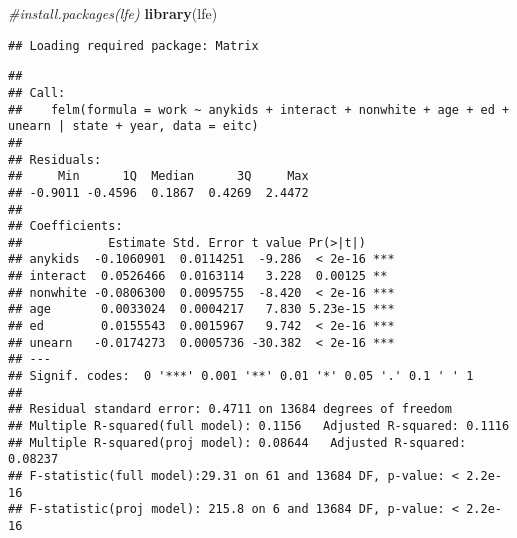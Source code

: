 \documentclass[
]{article}
\newenvironment{Shaded}{\begin{snugshade}}{\end{snugshade}}
\newcommand{\AttributeTok}[1]{\textcolor[rgb]{0.13,0.29,0.53}{#1}}
\newcommand{\CommentTok}[1]{\textcolor[rgb]{0.56,0.35,0.01}{\textit{#1}}}
\newcommand{\FunctionTok}[1]{\textcolor[rgb]{0.13,0.29,0.53}{\textbf{#1}}}
\newcommand{\NormalTok}[1]{#1}
\newcommand{\OtherTok}[1]{\textcolor[rgb]{0.56,0.35,0.01}{#1}}
\newcommand{\SpecialCharTok}[1]{\textcolor[rgb]{0.81,0.36,0.00}{\textbf{#1}}}
\begin{document}
\begin{Shaded}
\begin{Highlighting}[]
\CommentTok{\#install.packages(\textquotesingle{}lfe\textquotesingle{})}
\FunctionTok{library}\NormalTok{(lfe)}
\end{Highlighting}
\end{Shaded}

\begin{verbatim}
## Loading required package: Matrix
\end{verbatim}

\begin{Shaded}
\end{Shaded}

\begin{verbatim}
## 
## Call:
##    felm(formula = work ~ anykids + interact + nonwhite + age + ed +      unearn | state + year, data = eitc) 
## 
## Residuals:
##     Min      1Q  Median      3Q     Max 
## -0.9011 -0.4596  0.1867  0.4269  2.4472 
## 
## Coefficients:
##            Estimate Std. Error t value Pr(>|t|)    
## anykids  -0.1060901  0.0114251  -9.286  < 2e-16 ***
## interact  0.0526466  0.0163114   3.228  0.00125 ** 
## nonwhite -0.0806300  0.0095755  -8.420  < 2e-16 ***
## age       0.0033024  0.0004217   7.830 5.23e-15 ***
## ed        0.0155543  0.0015967   9.742  < 2e-16 ***
## unearn   -0.0174273  0.0005736 -30.382  < 2e-16 ***
## ---
## Signif. codes:  0 '***' 0.001 '**' 0.01 '*' 0.05 '.' 0.1 ' ' 1
## 
## Residual standard error: 0.4711 on 13684 degrees of freedom
## Multiple R-squared(full model): 0.1156   Adjusted R-squared: 0.1116 
## Multiple R-squared(proj model): 0.08644   Adjusted R-squared: 0.08237 
## F-statistic(full model):29.31 on 61 and 13684 DF, p-value: < 2.2e-16 
## F-statistic(proj model): 215.8 on 6 and 13684 DF, p-value: < 2.2e-16
\end{verbatim}
\end{document}
